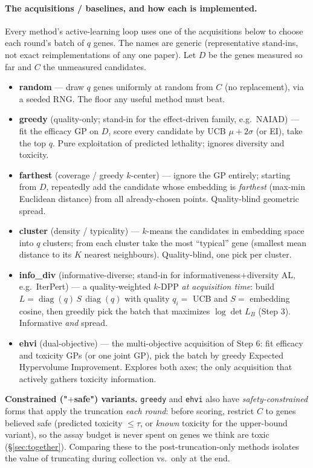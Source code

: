 \documentclass[11pt]{article}
\begin{document}
\paragraph{The acquisitions / baselines, and how each is implemented.} Every method's
active-learning loop uses one of the acquisitions below to choose each round's batch of $q$
genes. The names are generic (representative stand-ins, not exact reimplementations of any
one paper). Let $D$ be the genes measured so far and $C$ the unmeasured candidates.
\begin{itemize}[leftmargin=2em,itemsep=2pt]
\item \textbf{random} --- draw $q$ genes uniformly at random from $C$ (no replacement), via a
seeded RNG. The floor any useful method must beat.
\item \textbf{greedy} (quality-only; stand-in for the effect-driven family, e.g.\ NAIAD) ---
fit the efficacy GP on $D$, score every candidate by UCB $\mu+2\sigma$ (or EI), take the top
$q$. Pure exploitation of predicted lethality; ignores diversity and toxicity.
\item \textbf{farthest} (coverage / greedy $k$-center) --- ignore the GP entirely; starting
from $D$, repeatedly add the candidate whose embedding is \emph{farthest} (max-min Euclidean
distance) from all already-chosen points. Quality-blind geometric spread.
\item \textbf{cluster} (density / typicality) --- $k$-means the candidates in embedding space
into $q$ clusters; from each cluster take the most ``typical'' gene (smallest mean distance
to its $K$ nearest neighbours). Quality-blind, one pick per cluster.
\item \textbf{info\_div} (informative-diverse; stand-in for informativeness$+$diversity AL,
e.g.\ IterPert) --- a quality-weighted $k$-DPP \emph{at acquisition time}: build
$L=\operatorname{diag}(q)\,S\,\operatorname{diag}(q)$ with quality $q_i=$ UCB and
$S=$ embedding cosine, then greedily pick the batch that maximizes $\log\det L_B$ (Step 3).
Informative \emph{and} spread.
\item \textbf{ehvi} (dual-objective) --- the multi-objective acquisition of Step 6: fit
efficacy and toxicity GPs (or one joint GP), pick the batch by greedy Expected Hypervolume
Improvement. Explores both axes; the only acquisition that actively gathers toxicity
information.
\end{itemize}
\textbf{Constrained ("$+$safe") variants.} \texttt{greedy} and \texttt{ehvi} also have
\emph{safety-constrained} forms that apply the truncation \emph{each round}: before scoring,
restrict $C$ to genes believed safe (predicted toxicity $\le\tau$, or \emph{known} toxicity
for the upper-bound variant), so the assay budget is never spent on genes we think are toxic
(\S\ref{sec:together}). Comparing these to the post-truncation-only methods isolates the
value of truncating during collection vs.\ only at the end.
\end{document}
